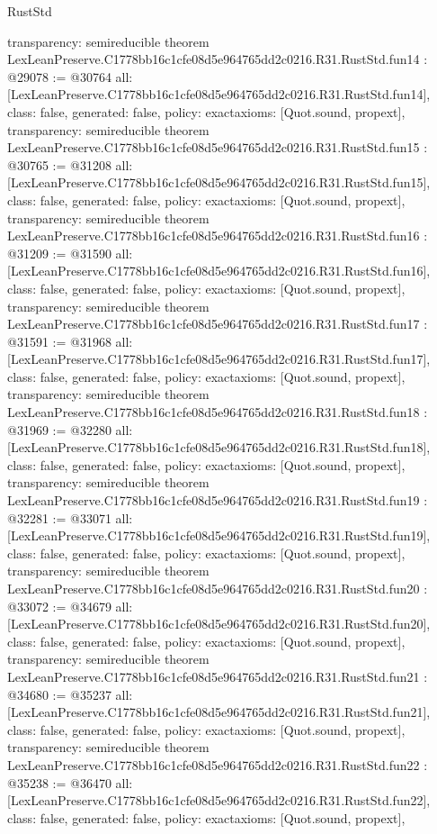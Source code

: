 \begin{lexlean}{RustStd}
\begin{coremodule}
{  transparency: semireducible
}
theorem LexLeanPreserve.C1778bb16c1cfe08d5e964765dd2c0216.R31.RustStd.fun14 : @29078 := @30764 {
  all: [LexLeanPreserve.C1778bb16c1cfe08d5e964765dd2c0216.R31.RustStd.fun14],
  class: false,
  generated: false,
  policy: exact{axioms: [Quot.sound, propext]},
  transparency: semireducible
}
theorem LexLeanPreserve.C1778bb16c1cfe08d5e964765dd2c0216.R31.RustStd.fun15 : @30765 := @31208 {
  all: [LexLeanPreserve.C1778bb16c1cfe08d5e964765dd2c0216.R31.RustStd.fun15],
  class: false,
  generated: false,
  policy: exact{axioms: [Quot.sound, propext]},
  transparency: semireducible
}
theorem LexLeanPreserve.C1778bb16c1cfe08d5e964765dd2c0216.R31.RustStd.fun16 : @31209 := @31590 {
  all: [LexLeanPreserve.C1778bb16c1cfe08d5e964765dd2c0216.R31.RustStd.fun16],
  class: false,
  generated: false,
  policy: exact{axioms: [Quot.sound, propext]},
  transparency: semireducible
}
theorem LexLeanPreserve.C1778bb16c1cfe08d5e964765dd2c0216.R31.RustStd.fun17 : @31591 := @31968 {
  all: [LexLeanPreserve.C1778bb16c1cfe08d5e964765dd2c0216.R31.RustStd.fun17],
  class: false,
  generated: false,
  policy: exact{axioms: [Quot.sound, propext]},
  transparency: semireducible
}
theorem LexLeanPreserve.C1778bb16c1cfe08d5e964765dd2c0216.R31.RustStd.fun18 : @31969 := @32280 {
  all: [LexLeanPreserve.C1778bb16c1cfe08d5e964765dd2c0216.R31.RustStd.fun18],
  class: false,
  generated: false,
  policy: exact{axioms: [Quot.sound, propext]},
  transparency: semireducible
}
theorem LexLeanPreserve.C1778bb16c1cfe08d5e964765dd2c0216.R31.RustStd.fun19 : @32281 := @33071 {
  all: [LexLeanPreserve.C1778bb16c1cfe08d5e964765dd2c0216.R31.RustStd.fun19],
  class: false,
  generated: false,
  policy: exact{axioms: [Quot.sound, propext]},
  transparency: semireducible
}
theorem LexLeanPreserve.C1778bb16c1cfe08d5e964765dd2c0216.R31.RustStd.fun20 : @33072 := @34679 {
  all: [LexLeanPreserve.C1778bb16c1cfe08d5e964765dd2c0216.R31.RustStd.fun20],
  class: false,
  generated: false,
  policy: exact{axioms: [Quot.sound, propext]},
  transparency: semireducible
}
theorem LexLeanPreserve.C1778bb16c1cfe08d5e964765dd2c0216.R31.RustStd.fun21 : @34680 := @35237 {
  all: [LexLeanPreserve.C1778bb16c1cfe08d5e964765dd2c0216.R31.RustStd.fun21],
  class: false,
  generated: false,
  policy: exact{axioms: [Quot.sound, propext]},
  transparency: semireducible
}
theorem LexLeanPreserve.C1778bb16c1cfe08d5e964765dd2c0216.R31.RustStd.fun22 : @35238 := @36470 {
  all: [LexLeanPreserve.C1778bb16c1cfe08d5e964765dd2c0216.R31.RustStd.fun22],
  class: false,
  generated: false,
  policy: exact{axioms: [Quot.sound, propext]},
}
\end{coremodule}
\end{lexlean}
